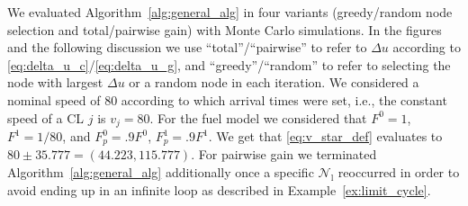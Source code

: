 \documentclass[letterpaper,10pt,conference,twocolumn]{IEEEtran}
\newcommand{\set}[1]{\mathcal{#1}}
\newcommand{\op}[1]{\mathrm{#1}}
\theoremstyle{definition}
\begin{document}
We evaluated Algorithm~\ref{alg:general_alg} in four variants (greedy/random node selection and total/pairwise gain) with Monte Carlo simulations. In the figures and the following discussion we use ``total''/``pairwise'' to refer to $\Delta u$ according to \eqref{eq:delta_u_c}/\eqref{eq:delta_u_g}, and ``greedy''/``random'' to refer to selecting the node with largest $\Delta u$ or a random node in each iteration. 
We considered a nominal speed of $80$ according to which arrival times were set,  i.e., the constant speed of a CL $j$ is $v_j = 80$.  
For the fuel model we considered that $F^0 = 1$, $F^1 = 1/80$, and $F_p^0 = .9F^0$, $F_p^1 = .9F^1$. We get that \eqref{eq:v_star_def} evaluates to $80 \pm 35.777 = (44.223, 115.777)$.
For pairwise gain we terminated Algorithm~\ref{alg:general_alg} additionally once a specific $\set{N}_\op{l}$ reoccurred in order to avoid ending up in an infinite loop as described in Example~\ref{ex:limit_cycle}. 
\end{document}
